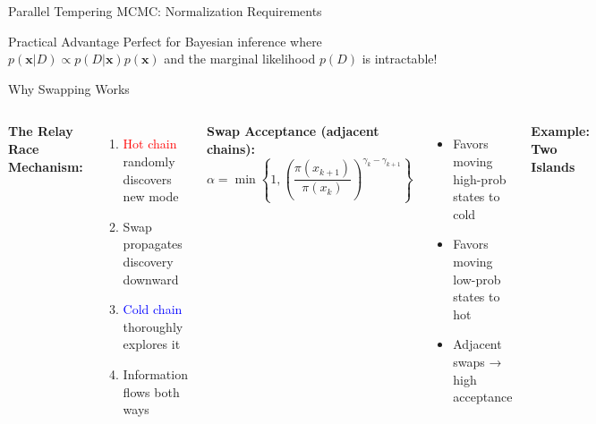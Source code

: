 \documentclass[aspectratio=169]{beamer}
\begin{document}
\begin{frame}{Parallel Tempering MCMC: Normalization Requirements}
\vspace{0.2cm}

\begin{exampleblock}{Practical Advantage}
Perfect for Bayesian inference where $p(\mathbf{x}|D) \propto p(D|\mathbf{x})p(\mathbf{x})$ and the marginal likelihood $p(D)$ is intractable!
\end{exampleblock}

\end{frame}

\begin{frame}{Why Swapping Works}

\begin{columns}
\textbf{The Relay Race Mechanism:}
\begin{enumerate}
\item \textcolor{red}{Hot chain} randomly discovers new mode
\item Swap propagates discovery downward
\item \textcolor{blue}{Cold chain} thoroughly explores it
\item Information flows both ways
\end{enumerate}

\vspace{0.3cm}
\textbf{Swap Acceptance (adjacent chains):}
$$\alpha = \min\left\{1, \left(\frac{\pi(x_{k+1})}{\pi(x_k)}\right)^{\gamma_k - \gamma_{k+1}}\right\}$$

\begin{itemize}
\item Favors moving high-prob states to cold
\item Favors moving low-prob states to hot
\item Adjacent swaps → high acceptance
\end{itemize}

\textbf{Example: Two Islands}


\end{columns}
\end{frame}
\end{document}
